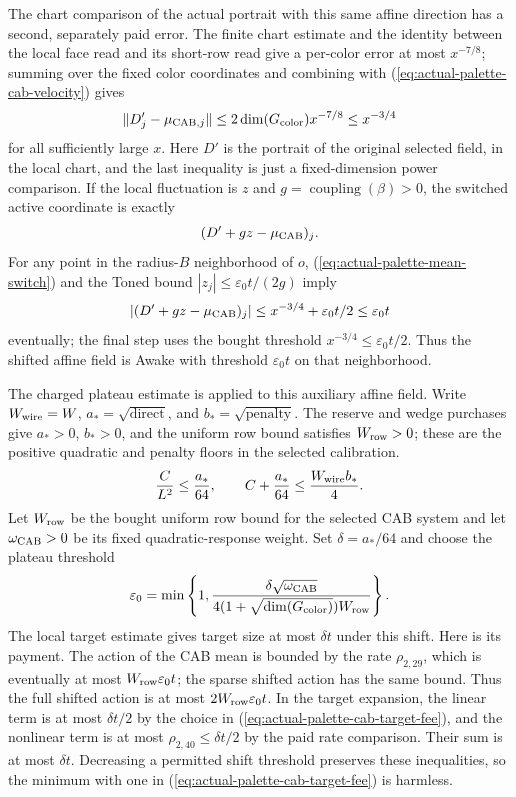 The chart comparison of the actual portrait with this same affine direction
has a second, separately paid error. The finite chart estimate and the
identity between the local face read and its short-row read give a
per-color error at most $x^{-7/8}$; summing over the fixed color
coordinates and combining with (\ref{eq:actual-palette-cab-velocity}) gives
\begin{equation}\label{eq:actual-palette-mean-switch}
 \|D'_j-\mu_{{\rm CAB},j}\|
       \leq 2\dim(G_{\rm color})x^{-7/8}\leq x^{-3/4}
\end{equation}
for all sufficiently large $x$. Here $D'$ is the portrait of the original
selected field, in the local chart, and the last inequality is just a
fixed-dimension power comparison. If the local fluctuation is $z$ and
$g=\operatorname{coupling}(\beta)>0$, the switched active coordinate is
exactly
\[
   (D'+gz-\mu_{\rm CAB})_j.
\]
For any point in the radius-$B$ neighborhood of $o$,
(\ref{eq:actual-palette-mean-switch}) and the Toned bound
$|z_j|\leq\varepsilon_0t/(2g)$ imply
\[
 |(D'+gz-\mu_{\rm CAB})_j|
      \leq x^{-3/4}+\varepsilon_0t/2\leq\varepsilon_0t
\]
eventually; the final step uses the bought threshold
$x^{-3/4}\leq\varepsilon_0t/2$. Thus the shifted affine field is Awake
with threshold $\varepsilon_0t$ on that neighborhood.

The charged plateau estimate is applied to this auxiliary affine field.
Write $W_{\rm wire}=W$, $a_* = \sqrt{\mathrm{direct}}$, and
$b_* = \sqrt{\mathrm{penalty}}$. The reserve and wedge purchases give
$a_*>0$, $b_*>0$, and the uniform row bound satisfies $W_{\rm row}>0$;
these are the positive quadratic and penalty floors in the selected
calibration.
\begin{equation}\label{eq:actual-palette-cab-wedge}
 \frac{C}{L^2}\leq\frac{a_*}{64},\qquad
 C+\frac{a_*}{64}\leq\frac{W_{\rm wire}b_*}{4}.
\end{equation}
Let $W_{\rm row}$ be the bought uniform row bound for the selected CAB
system and let $\omega_{\rm CAB}>0$ be its fixed quadratic-response weight.
Set $\delta=a_*/64$ and choose the plateau threshold
\begin{equation}\label{eq:actual-palette-cab-target-fee}
 \varepsilon_0=\min\left\{1,
   \frac{\delta\sqrt{\omega_{\rm CAB}}}
   {4(1+\sqrt{\dim(G_{\rm color})})W_{\rm row}}\right\}.
\end{equation}
The local target estimate gives target size at most $\delta t$ under this
shift. Here is its payment. The action of the CAB mean is bounded by the
rate $\rho_{2,29}$, which is eventually at most
$W_{\rm row}\varepsilon_0t$; the sparse shifted action has the same bound.
Thus the full shifted action is at most
$2W_{\rm row}\varepsilon_0t$. In the target expansion, the linear term is
at most $\delta t/2$ by the choice in (\ref{eq:actual-palette-cab-target-fee}),
and the nonlinear term is at most $\rho_{2,40}\leq\delta t/2$ by the paid
rate comparison. Their sum is at most $\delta t$. Decreasing a permitted
shift threshold preserves these inequalities, so the minimum with one in
(\ref{eq:actual-palette-cab-target-fee}) is harmless.

